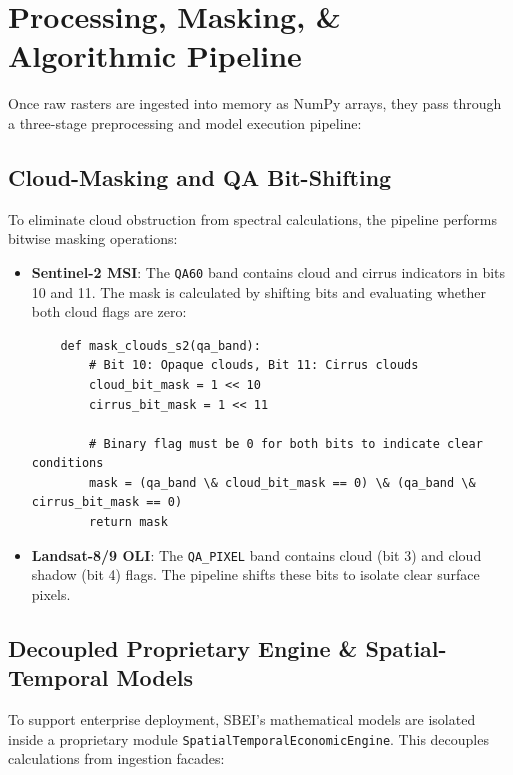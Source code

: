 \section{Processing, Masking, \& Algorithmic Pipeline}
Once raw rasters are ingested into memory as NumPy arrays, they pass through a three-stage preprocessing and model execution pipeline:

\subsection{Cloud-Masking and QA Bit-Shifting}
To eliminate cloud obstruction from spectral calculations, the pipeline performs bitwise masking operations:
\begin{itemize}
  \item \textbf{Sentinel-2 MSI}: The \texttt{QA60} band contains cloud and cirrus indicators in bits 10 and 11. The mask is calculated by shifting bits and evaluating whether both cloud flags are zero:
\begin{verbatim}
    def mask_clouds_s2(qa_band):
        # Bit 10: Opaque clouds, Bit 11: Cirrus clouds
        cloud_bit_mask = 1 << 10
        cirrus_bit_mask = 1 << 11
        
        # Binary flag must be 0 for both bits to indicate clear conditions
        mask = (qa_band \& cloud_bit_mask == 0) \& (qa_band \& cirrus_bit_mask == 0)
        return mask
\end{verbatim}
  \item \textbf{Landsat-8/9 OLI}: The \texttt{QA\_PIXEL} band contains cloud (bit 3) and cloud shadow (bit 4) flags. The pipeline shifts these bits to isolate clear surface pixels.

\end{itemize}
\subsection{Decoupled Proprietary Engine \& Spatial-Temporal Models}
To support enterprise deployment, SBEI's mathematical models are isolated inside a proprietary module \texttt{SpatialTemporalEconomicEngine}. This decouples calculations from ingestion facades:

